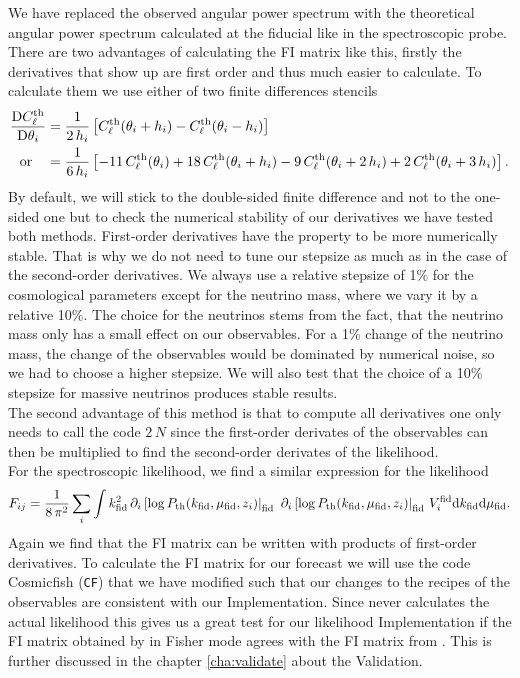 \documentclass[../main.tex]{subfiles}
\begin{document}
We have replaced the observed angular power spectrum with the theoretical angular power spectrum calculated at the fiducial like in the spectroscopic probe. There are two advantages of calculating the FI matrix like this, firstly the derivatives that show up are first order and thus much easier to calculate. To calculate them we use either of two finite differences stencils 
\begin{align}
\frac{\mathrm{D} C^\mathrm{th}_\ell}{\mathrm{D} \theta_i} &= \frac{1}{2\,h_i}\left[C^\mathrm{th}_\ell(\theta_i+h_i)-C^\mathrm{th}_\ell(\theta_i-h_i)\right]\\
\text{or}\quad&= \frac{1}{6\,h_i}\left[-11\,C^\mathrm{th}_\ell(\theta_i)+18\,C^\mathrm{th}_\ell(\theta_i+h_i)-9\,C^\mathrm{th}_\ell(\theta_i+2\,h_i)+2\,C^\mathrm{th}_\ell(\theta_i+3\,h_i)\right].
\end{align}
By default, we will stick to the double-sided finite difference and not to the one-sided one but to check the numerical stability of our derivatives we have tested both methods. First-order derivatives have the property to be more numerically stable. That is why we do not need to tune our stepsize as much as in the case of the second-order derivatives. We always use a relative stepsize of 1\% for the cosmological parameters except for the neutrino mass, where we vary it by a relative 10\%. The choice for the neutrinos stems from the fact, that the neutrino mass only has a small effect on our observables. For a 1\% change of the neutrino mass, the change of the observables would be dominated by numerical noise, so we had to choose a higher stepsize. We will also test that the choice of a 10\% stepsize for massive neutrinos produces stable results.\\
The second advantage of this method is that to compute all derivatives one only needs to call the code $2\, N$ since the first-order derivates of the observables can then be multiplied to find the second-order derivates of the likelihood.\\
For the spectroscopic likelihood, we find a similar expression for the likelihood \begin{equation}
    F_{ij} = \frac{1}{8\,\pi^2}\sum_i \int k_\mathrm{fid}^2 \,\partial_i \left[\log P_\mathrm{th}(k_\mathrm{fid},\mu_\mathrm{fid},z_i) \right|_\mathrm{fid}\,\,\partial_i \left[\log P_\mathrm{th}(k_\mathrm{fid},\mu_\mathrm{fid},z_i)\right|_\mathrm{fid}\,V_i^\mathrm{fid} \mathrm{d} k_\mathrm{fid} \mathrm{d} \mu_\mathrm{fid}  .
\end{equation}
Again we find that the FI matrix can be written with products of first-order derivatives. To calculate the FI matrix for our forecast we will use the code Cosmicfish ({\tt CF}) that we have modified such that our changes to the recipes of the observables are consistent with our \montepython Implementation. Since \cosmicfish never calculates the actual likelihood this gives us a great test for our likelihood Implementation if the FI matrix obtained by \montepython in Fisher mode agrees with the FI matrix from \cosmicfish. This is further discussed in the chapter \ref{cha:validate} about the Validation.\\
\end{document}
